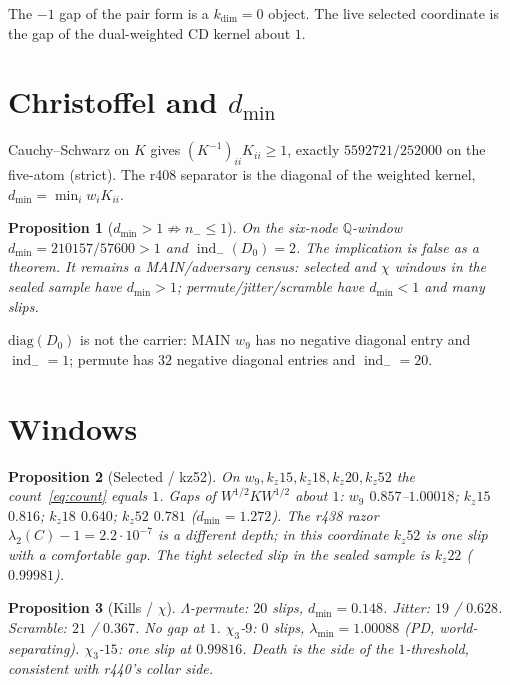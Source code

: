 \documentclass[11pt]{article}
\newtheorem{prop}{Proposition}
\theoremstyle{remark}
\newcommand{\indm}{\operatorname{ind}_{-}}
\begin{document}
The $-1$ gap of the pair form is a $k_{\dim}=0$ object.
The live selected coordinate is the gap of the
dual-weighted CD kernel about $1$.

\section{Christoffel and $d_{\min}$}

Cauchy--Schwarz on $K$ gives $(K^{-1})_{ii}K_{ii}\ge 1$,
exactly $5592721/252000$ on the five-atom (strict).
The r408 separator is the diagonal of the weighted kernel,
$d_{\min}=\min_i w_i K_{ii}$.

\begin{prop}[$d_{\min}>1\not\Rightarrow n_{-}\le 1$]\label{prop:dmin}
On the six-node $\mathbb{Q}$-window
$d_{\min}=210157/57600>1$ and $\indm(D_0)=2$.
The implication is false as a theorem.
It remains a MAIN/adversary census:
selected and $\chi$ windows in the sealed sample have
$d_{\min}>1$; permute/jitter/scramble have $d_{\min}<1$
and many slips.
\end{prop}

$\mathrm{diag}(D_0)$ is not the carrier: MAIN $w_9$ has
no negative diagonal entry and $\indm=1$; permute has
$32$ negative diagonal entries and $\indm=20$.

\section{Windows}

\begin{prop}[Selected / kz52]\label{prop:windows}
On $w_9,k_z15,k_z18,k_z20,k_z52$ the count~\eqref{eq:count}
equals $1$.
Gaps of $W^{1/2}KW^{1/2}$ about $1$:
$w_9$ $0.857$--$1.00018$;
$k_z15$ $0.816$;
$k_z18$ $0.640$;
$k_z52$ $0.781$ ($d_{\min}=1.272$).
The r438 razor $\lambda_2(C)-1=2.2\cdot 10^{-7}$ is a
different depth; in this coordinate $k_z52$ is one slip
with a comfortable gap.
The tight selected slip in the sealed sample is $k_z22$
($0.99981$).
\end{prop}

\begin{prop}[Kills / $\chi$]\label{prop:kills}
$\Lambda$-permute: $20$ slips, $d_{\min}=0.148$.
Jitter: $19$ / $0.628$.
Scramble: $21$ / $0.367$.
No gap at $1$.
$\chi_3$-$9$: $0$ slips, $\lambda_{\min}=1.00088$ (PD,
world-separating).
$\chi_3$-$15$: one slip at $0.99816$.
Death is the side of the $1$-threshold, consistent with
r440's collar side.
\end{prop}
\end{document}
